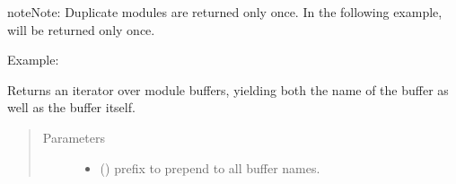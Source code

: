 \documentclass[letterpaper,10pt,english]{sphinxmanual}
\begin{document}
\begin{fulllineitems}
\begin{fulllineitems}
\begin{quote}
\begin{description}
\end{description}\end{quote}

\begin{sphinxadmonition}{note}{Note:}
Duplicate modules are returned only once. In the following
example,  will be returned only once.
\end{sphinxadmonition}

Example:

\begin{sphinxVerbatim}[commandchars=\\\{\}]
   
   
    

\end{sphinxVerbatim}

\end{fulllineitems}


\begin{fulllineitems}
\label{\detokenize{api/dynamics:geology.metamodelling.dynamics.NeuralDifferentialEquation.named_buffers}}
Returns an iterator over module buffers, yielding both the
name of the buffer as well as the buffer itself.
\begin{quote}\begin{description}
\item[{Parameters}] \leavevmode\begin{itemize}
\item {} 
 () \textendash{} prefix to prepend to all buffer names.


\end{itemize}
\end{description}
\end{quote}
\end{fulllineitems}
\end{fulllineitems}
\end{document}
